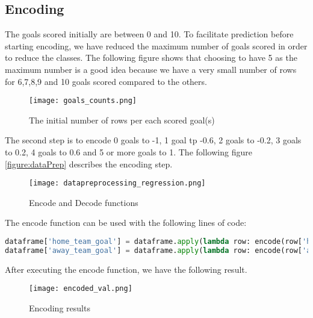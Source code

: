 \subsection {Encoding}

The goals scored initially are between 0 and 10.
To facilitate prediction before starting encoding, we have reduced the maximum number of goals scored in order to reduce the classes. The following figure shows that choosing to have 5 as the maximum number is a good idea because we have a very small number of rows for 6,7,8,9 and 10 goals scored compared to the others.

\begin{figure}[H]
\begin{center}
\texttt{[image: goals\_counts.png]}
\end{center}
\caption{The initial number of rows per each scored goal(s)}
\label{figure:goals_counts}
\end{figure}


The second step is to encode 0 goals to -1, 1 goal tp -0.6, 2 goals to -0.2, 3 goals to 0.2, 4 goals to 0.6 and 5 or more goals to 1.
The following figure \autoref{figure:dataPrep} describes the encoding step.\newline
\begin{figure}[H]
\begin{center}
\texttt{[image: datapreprocessing\_regression.png]}
\end{center}
\caption{Encode and Decode functions}
\label{figure:dataPrep}
\end{figure}



The encode function can be used with the following lines of code:

\begin{lstlisting}[language=Python, caption=Scored goals Python code for encoding classes]
dataframe['home_team_goal'] = dataframe.apply(lambda row: encode(row['home_team_goal']), axis=1)
dataframe['away_team_goal'] = dataframe.apply(lambda row: encode(row['away_team_goal']), axis=1)
\end{lstlisting}


After executing the encode function, we have the following result.

\begin{figure}[H]
\begin{center}
\texttt{[image: encoded\_val.png]}
\end{center}
\caption{Encoding results}
\label{figure:encoding}
\end{figure}


